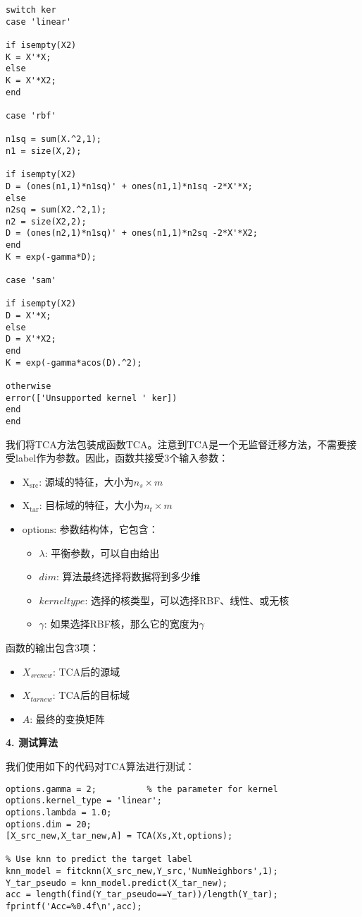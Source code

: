 \begin{lstlisting}[title=TCA方法的Matlab实现, frame=shadowbox]
switch ker
case 'linear'

if isempty(X2)
K = X'*X;
else
K = X'*X2;
end

case 'rbf'

n1sq = sum(X.^2,1);
n1 = size(X,2);

if isempty(X2)
D = (ones(n1,1)*n1sq)' + ones(n1,1)*n1sq -2*X'*X;
else
n2sq = sum(X2.^2,1);
n2 = size(X2,2);
D = (ones(n2,1)*n1sq)' + ones(n1,1)*n2sq -2*X'*X2;
end
K = exp(-gamma*D); 

case 'sam'

if isempty(X2)
D = X'*X;
else
D = X'*X2;
end
K = exp(-gamma*acos(D).^2);

otherwise
error(['Unsupported kernel ' ker])
end
end

\end{lstlisting}

我们将TCA方法包装成函数$\mathrm{TCA}$。注意到TCA是一个无监督迁移方法，不需要接受label作为参数。因此，函数共接受3个输入参数：

\begin{itemize}
	\item $\mathrm{X_{src}}$: 源域的特征，大小为$n_s \times m$
	\item $\mathrm{X_{tar}}$: 目标域的特征，大小为$n_t \times m$
	\item $\mathrm{options}$: 参数结构体，它包含：
	\begin{itemize}
		\item $\lambda$: 平衡参数，可以自由给出
		\item $dim$: 算法最终选择将数据将到多少维
		\item $kernel type$: 选择的核类型，可以选择RBF、线性、或无核
		\item $\gamma$: 如果选择RBF核，那么它的宽度为$\gamma$
	\end{itemize}
\end{itemize}

函数的输出包含3项：
\begin{itemize}
	\item $X_{srcnew}$: TCA后的源域
	\item $X_{tarnew}$: TCA后的目标域
	\item $A$: 最终的变换矩阵
\end{itemize}

\textbf{4. 测试算法}

我们使用如下的代码对TCA算法进行测试：

\begin{lstlisting}
options.gamma = 2;          % the parameter for kernel
options.kernel_type = 'linear';
options.lambda = 1.0;
options.dim = 20;
[X_src_new,X_tar_new,A] = TCA(Xs,Xt,options);

% Use knn to predict the target label
knn_model = fitcknn(X_src_new,Y_src,'NumNeighbors',1);
Y_tar_pseudo = knn_model.predict(X_tar_new);
acc = length(find(Y_tar_pseudo==Y_tar))/length(Y_tar); 
fprintf('Acc=%0.4f\n',acc);
\end{lstlisting}


